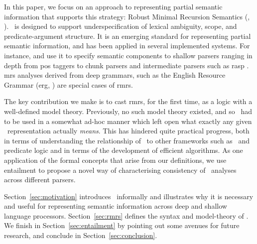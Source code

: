 In this paper, we focus on an approach to representing partial
semantic information that supports this strategy: Robust Minimal
Recursion Semantics (\rmrs, \cite{copestake:2007a,copestake:2007b}).
\rmrs\ is designed to support underspecification of lexical ambiguity,
scope, and predicate-argument structure.  It is an emerging standard
for representing partial semantic information, and has been applied in
several implemented systems.  For instance, 
and  use it to specify semantic components to
shallow parsers ranging in depth from {\sc pos} taggers to chunk
parsers and intermediate parsers such as {\sc rasp}
\cite{briscoe:etal:2006}.  {\sc mrs} analyses
\cite{copestake:etal:2005} derived from deep grammars, such as the
English Resource Grammar ({\sc erg}, \cite{copestake:flickinger:2000})
are special cases of {\sc rmrs}.

The key contribution we make is to cast {\sc rmrs}, for the first
time, as a logic with a well-defined model theory.  Previously, no
such model theory existed, and so \rmrs\ had to be used in a somewhat
ad-hoc manner which left open what exactly any given \rmrs\
representation actually \emph{means}.  This has hindered quite
practical progress, both in terms of understanding the relationship of
\rmrs\ to other frameworks such as \mrs\ and predicate logic and in
terms of the development of efficient algorithms.  As one application
of the formal concepts that arise from our definitions, we use
entailment to propose a
novel way of characterising consistency of \rmrs\ analyses across
different parsers.

Section~\ref{sec:motivation} introduces \rmrs\ informally and
illustrates why it is necessary and useful for representing semantic
information across deep and shallow language processors.
Section~\ref{sec:rmrs} defines the syntax and model-theory of \rmrs.
We finish in Section~\ref{sec:entailment} by pointing out some avenues
for future research, and conclude in Section~\ref{sec:conclusion}.


